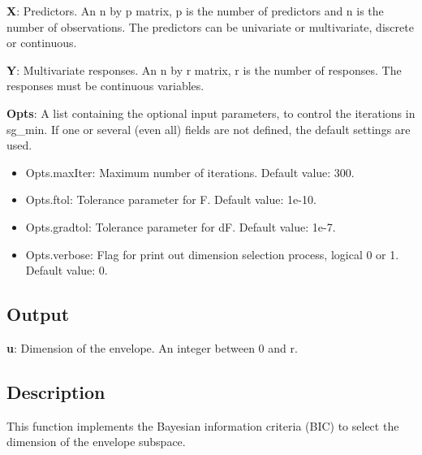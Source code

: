 \documentclass[a4paper,11pt,openany]{memoir}
\begin{document}
\begin{par}
\textbf{X}: Predictors. An n by p matrix, p is the number of predictors and n is the number of observations. The predictors can be univariate or multivariate, discrete or continuous.
\end{par} \vspace{1em}
\begin{par}
\textbf{Y}: Multivariate responses. An n by r matrix, r is the number of responses. The responses must be continuous variables.
\end{par} \vspace{1em}
\begin{par}
\textbf{Opts}: A list containing the optional input parameters, to control the iterations in sg\_min. If one or several (even all) fields are not defined, the default settings are used.
\end{par} \vspace{1em}
\begin{itemize}
\setlength{\itemsep}{-1ex}
   \item Opts.maxIter: Maximum number of iterations.  Default value: 300.
   \item Opts.ftol: Tolerance parameter for F.  Default value: 1e-10.
   \item Opts.gradtol: Tolerance parameter for dF.  Default value: 1e-7.
   \item Opts.verbose: Flag for print out dimension selection process, logical 0 or 1. Default value: 0.
\end{itemize}


\subsection*{Output}

\begin{par}
\textbf{u}: Dimension of the envelope. An integer between 0 and r.
\end{par} \vspace{1em}


\subsection*{Description}

\begin{par}
This function implements the Bayesian information criteria (BIC) to select the dimension of the envelope subspace.
\end{par} \vspace{1em}
\end{document}
